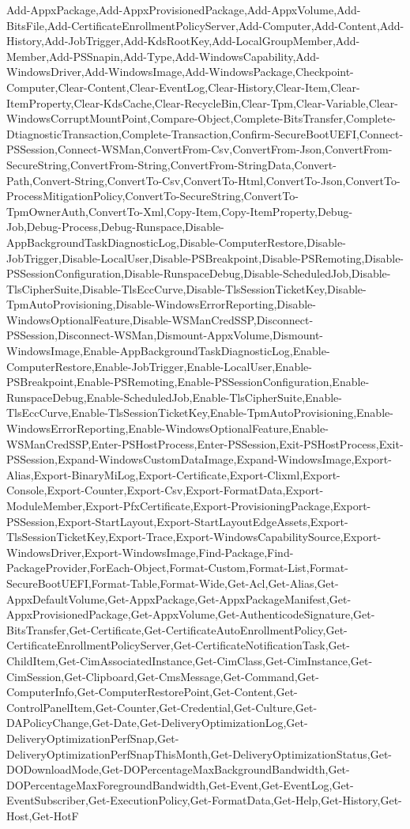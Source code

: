 {{		Add-AppxPackage,Add-AppxProvisionedPackage,Add-AppxVolume,Add-BitsFile,Add-CertificateEnrollmentPolicyServer,Add-Computer,Add-Content,Add-History,Add-JobTrigger,Add-KdsRootKey,Add-LocalGroupMember,Add-Member,Add-PSSnapin,Add-Type,Add-WindowsCapability,Add-WindowsDriver,Add-WindowsImage,Add-WindowsPackage,Checkpoint-Computer,Clear-Content,Clear-EventLog,Clear-History,Clear-Item,Clear-ItemProperty,Clear-KdsCache,Clear-RecycleBin,Clear-Tpm,Clear-Variable,Clear-WindowsCorruptMountPoint,Compare-Object,Complete-BitsTransfer,Complete-DtiagnosticTransaction,Complete-Transaction,Confirm-SecureBootUEFI,Connect-PSSession,Connect-WSMan,ConvertFrom-Csv,ConvertFrom-Json,ConvertFrom-SecureString,ConvertFrom-String,ConvertFrom-StringData,Convert-Path,Convert-String,ConvertTo-Csv,ConvertTo-Html,ConvertTo-Json,ConvertTo-ProcessMitigationPolicy,ConvertTo-SecureString,ConvertTo-TpmOwnerAuth,ConvertTo-Xml,Copy-Item,Copy-ItemProperty,Debug-Job,Debug-Process,Debug-Runspace,Disable-AppBackgroundTaskDiagnosticLog,Disable-ComputerRestore,Disable-JobTrigger,Disable-LocalUser,Disable-PSBreakpoint,Disable-PSRemoting,Disable-PSSessionConfiguration,Disable-RunspaceDebug,Disable-ScheduledJob,Disable-TlsCipherSuite,Disable-TlsEccCurve,Disable-TlsSessionTicketKey,Disable-TpmAutoProvisioning,Disable-WindowsErrorReporting,Disable-WindowsOptionalFeature,Disable-WSManCredSSP,Disconnect-PSSession,Disconnect-WSMan,Dismount-AppxVolume,Dismount-WindowsImage,Enable-AppBackgroundTaskDiagnosticLog,Enable-ComputerRestore,Enable-JobTrigger,Enable-LocalUser,Enable-PSBreakpoint,Enable-PSRemoting,Enable-PSSessionConfiguration,Enable-RunspaceDebug,Enable-ScheduledJob,Enable-TlsCipherSuite,Enable-TlsEccCurve,Enable-TlsSessionTicketKey,Enable-TpmAutoProvisioning,Enable-WindowsErrorReporting,Enable-WindowsOptionalFeature,Enable-WSManCredSSP,Enter-PSHostProcess,Enter-PSSession,Exit-PSHostProcess,Exit-PSSession,Expand-WindowsCustomDataImage,Expand-WindowsImage,Export-Alias,Export-BinaryMiLog,Export-Certificate,Export-Clixml,Export-Console,Export-Counter,Export-Csv,Export-FormatData,Export-ModuleMember,Export-PfxCertificate,Export-ProvisioningPackage,Export-PSSession,Export-StartLayout,Export-StartLayoutEdgeAssets,Export-TlsSessionTicketKey,Export-Trace,Export-WindowsCapabilitySource,Export-WindowsDriver,Export-WindowsImage,Find-Package,Find-PackageProvider,ForEach-Object,Format-Custom,Format-List,Format-SecureBootUEFI,Format-Table,Format-Wide,Get-Acl,Get-Alias,Get-AppxDefaultVolume,Get-AppxPackage,Get-AppxPackageManifest,Get-AppxProvisionedPackage,Get-AppxVolume,Get-AuthenticodeSignature,Get-BitsTransfer,Get-Certificate,Get-CertificateAutoEnrollmentPolicy,Get-CertificateEnrollmentPolicyServer,Get-CertificateNotificationTask,Get-ChildItem,Get-CimAssociatedInstance,Get-CimClass,Get-CimInstance,Get-CimSession,Get-Clipboard,Get-CmsMessage,Get-Command,Get-ComputerInfo,Get-ComputerRestorePoint,Get-Content,Get-ControlPanelItem,Get-Counter,Get-Credential,Get-Culture,Get-DAPolicyChange,Get-Date,Get-DeliveryOptimizationLog,Get-DeliveryOptimizationPerfSnap,Get-DeliveryOptimizationPerfSnapThisMonth,Get-DeliveryOptimizationStatus,Get-DODownloadMode,Get-DOPercentageMaxBackgroundBandwidth,Get-DOPercentageMaxForegroundBandwidth,Get-Event,Get-EventLog,Get-EventSubscriber,Get-ExecutionPolicy,Get-FormatData,Get-Help,Get-History,Get-Host,Get-HotF}}
